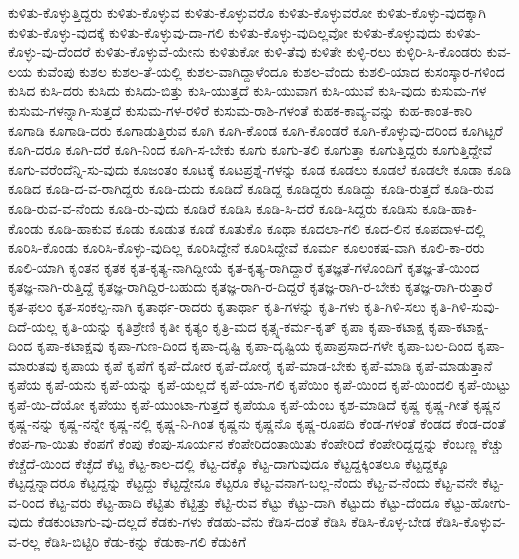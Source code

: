 {ಕುಳಿತು-ಕೊಳ್ಳುತ್ತಿದ್ದರು
ಕುಳಿತು-ಕೊಳ್ಳುವ
ಕುಳಿತು-ಕೊಳ್ಳುವರೊ
ಕುಳಿತು-ಕೊಳ್ಳುವರೋ
ಕುಳಿತು-ಕೊಳ್ಳು-ವುದಕ್ಕಾಗಿ
ಕುಳಿತು-ಕೊಳ್ಳು-ವುದಕ್ಕೆ
ಕುಳಿತು-ಕೊಳ್ಳುವು-ದಾ-ಗಲಿ
ಕುಳಿತು-ಕೊಳ್ಳು-ವುದಿಲ್ಲವೋ
ಕುಳಿತು-ಕೊಳ್ಳುವುದು
ಕುಳಿತು-ಕೊಳ್ಳು-ವು-ದೆಂದರೆ
ಕುಳಿತು-ಕೊಳ್ಳುವೆ-ಯೇನು
ಕುಳಿತುಕೋ
ಕುಳಿ-ತೆವು
ಕುಳಿತೇ
ಕುಳ್ಳಿ-ರಲು
ಕುಳ್ಳಿರಿ-ಸಿ-ಕೊಂಡರು
ಕುವ-ಲಯ
ಕುವೆಂಪು
ಕುಶಲ
ಕುಶಲ-ತೆ-ಯಲ್ಲಿ
ಕುಶಲ-ವಾಗಿದ್ದಾಳೆಂದೂ
ಕುಶಲ-ವೆಂದು
ಕುಶಲಿ-ಯಾದ
ಕುಸಂಸ್ಕಾರ-ಗಳಿಂದ
ಕುಸಿದ
ಕುಸಿ-ದರು
ಕುಸಿದು
ಕುಸಿದು-ಬಿತ್ತು
ಕುಸಿ-ಯುತ್ತದೆ
ಕುಸಿ-ಯುವಾಗ
ಕುಸಿ-ಯುವೆ
ಕುಸಿ-ವುದು
ಕುಸುಮ-ಗಳ
ಕುಸುಮ-ಗಳನ್ನಾಗಿ-ಸುತ್ತದೆ
ಕುಸುಮ-ಗಳ-ರಳಿರೆ
ಕುಸುಮ-ರಾಶಿ-ಗಳಂತೆ
ಕುಹಕ-ಕಾವ್ಯ-ವನ್ನು
ಕುಹ-ಕಾಂತ-ಕಾರಿ
ಕೂಗಾಡಿ
ಕೂಗಾಡಿ-ದರು
ಕೂಗಾಡುತ್ತಿರುವ
ಕೂಗಿ
ಕೂಗಿ-ಕೊಂಡ
ಕೂಗಿ-ಕೊಂಡರೆ
ಕೂಗಿ-ಕೊಳ್ಳುವು-ದರಿಂದ
ಕೂಗಿಟ್ಟರೆ
ಕೂಗಿ-ದರೂ
ಕೂಗಿ-ದರೆ
ಕೂಗಿ-ನಿಂದ
ಕೂಗಿ-ಸ-ಬೇಕು
ಕೂಗು
ಕೂಗು-ತಲಿ
ಕೂಗುತ್ತಾ
ಕೂಗುತ್ತಿದ್ದರು
ಕೂಗುತ್ತಿದ್ದೇವೆ
ಕೂಗು-ವರೆಂದೆನ್ನಿ-ಸು-ವುದು
ಕೂಜಂತಂ
ಕೂಟಕ್ಕೆ
ಕೂಟಪ್ರಶ್ನೆ-ಗಳನ್ನು
ಕೂಡ
ಕೂಡಲು
ಕೂಡಲೆ
ಕೂಡಲೇ
ಕೂಡಾ
ಕೂಡಿ
ಕೂಡಿದ
ಕೂಡಿ-ದ-ವ-ರಾಗಿದ್ದರು
ಕೂಡಿ-ದುದು
ಕೂಡಿದೆ
ಕೂಡಿದ್ದ
ಕೂಡಿದ್ದರು
ಕೂಡಿದ್ದು
ಕೂಡಿ-ರುತ್ತದೆ
ಕೂಡಿ-ರುವ
ಕೂಡಿ-ರುವ-ವ-ನೆಂದು
ಕೂಡಿ-ರು-ವುದು
ಕೂಡಿರೆ
ಕೂಡಿಸಿ
ಕೂಡಿ-ಸಿ-ದರೆ
ಕೂಡಿ-ಸಿದ್ದರು
ಕೂಡಿಸು
ಕೂಡಿ-ಹಾಕಿ-ಕೊಂಡು
ಕೂಡಿ-ಹಾಕುವ
ಕೂಡು
ಕೂಡುತ
ಕೂಡೆ
ಕೂತುಕೊ
ಕೂಥಾ
ಕೂದಲಾ-ಗಲಿ
ಕೂದ-ಲಿನ
ಕೂಪದಾಳ-ದಲ್ಲಿ
ಕೂರಿಸಿ-ಕೊಂಡು
ಕೂರಿಸಿ-ಕೊಳ್ಳು-ವುದಿಲ್ಲ
ಕೂರಿಸಿದ್ದೇನೆ
ಕೂರಿಸಿದ್ದೇವೆ
ಕೂರ್ಮ
ಕೂಲಂಕಷ-ವಾಗಿ
ಕೂಲಿ-ಕಾ-ರರು
ಕೂಲಿ-ಯಾಗಿ
ಕೃಂತನ
ಕೃತಕ
ಕೃತ-ಕೃತ್ಯ-ನಾಗಿದ್ದೀಯೆ
ಕೃತ-ಕೃತ್ಯ-ರಾಗಿದ್ದಾರೆ
ಕೃತಜ್ಞತೆ-ಗಳೊಂದಿಗೆ
ಕೃತಜ್ಞ-ತೆ-ಯಿಂದ
ಕೃತಜ್ಞ-ನಾಗಿ-ರುತ್ತಿದ್ದೆ
ಕೃತಜ್ಞ-ರಾಗಿದ್ದಿರ-ಬಹುದು
ಕೃತಜ್ಞ-ರಾಗಿ-ರ-ದಿದ್ದರೆ
ಕೃತಜ್ಞ-ರಾಗಿ-ರ-ಬೇಕು
ಕೃತಜ್ಞ-ರಾಗಿ-ರುತ್ತಾರೆ
ಕೃತ-ಫಲಂ
ಕೃತ-ಸಂಕಲ್ಪ-ನಾಗಿ
ಕೃತಾರ್ಥ-ರಾದರು
ಕೃತಾರ್ಥಾ
ಕೃತಿ-ಗಳನ್ನು
ಕೃತಿ-ಗಳು
ಕೃತಿ-ಗಿಳಿ-ಸಲು
ಕೃತಿ-ಗಿಳಿ-ಸುವು-ದಿದೆ-ಯಲ್ಲ
ಕೃತಿ-ಯನ್ನು
ಕೃತಿಶ್ರೇಣಿ
ಕೃತೀ
ಕೃತ್ಯಂ
ಕೃತ್ರಿ-ಮದ
ಕೃತ್ಸ್ನ-ಕರ್ಮ-ಕೃತ್
ಕೃಪಾ
ಕೃಪಾ-ಕಟಾಕ್ಷ
ಕೃಪಾ-ಕಟಾಕ್ಷ-ದಿಂದ
ಕೃಪಾ-ಕಟಾಕ್ಷವು
ಕೃಪಾ-ಗುಣ-ದಿಂದ
ಕೃಪಾ-ದೃಷ್ಟಿ
ಕೃಪಾ-ದೃಷ್ಟಿಯ
ಕೃಪಾಪ್ರಸಾದ-ಗಳೇ
ಕೃಪಾ-ಬಲ-ದಿಂದ
ಕೃಪಾ-ಮಾರುತವು
ಕೃಪಾಯ
ಕೃಪೆ
ಕೃಪೆಗೆ
ಕೃಪೆ-ದೋರ
ಕೃಪೆ-ದೋರೈ
ಕೃಪೆ-ಮಾಡ-ಬೇಕು
ಕೃಪೆ-ಮಾಡಿ
ಕೃಪೆ-ಮಾಡುತ್ತಾನೆ
ಕೃಪೆಯ
ಕೃಪೆ-ಯನು
ಕೃಪೆ-ಯನ್ನು
ಕೃಪೆ-ಯಲ್ಲದೆ
ಕೃಪೆ-ಯಾ-ಗಲಿ
ಕೃಪೆಯಿಂ
ಕೃಪೆ-ಯಿಂದ
ಕೃಪೆ-ಯಿಂದಲಿ
ಕೃಪೆ-ಯಿಟ್ಟು
ಕೃಪೆ-ಯಿ-ದೆಯೋ
ಕೃಪೆಯು
ಕೃಪೆ-ಯುಂಟಾ-ಗುತ್ತದೆ
ಕೃಪೆಯೂ
ಕೃಪೆ-ಯೆಂಬ
ಕೃಶ-ಮಾಡಿದೆ
ಕೃಷ್ಣ
ಕೃಷ್ಣ-ಗೀತೆ
ಕೃಷ್ಣನ
ಕೃಷ್ಣ-ನನ್ನು
ಕೃಷ್ಣ-ನನ್ನೇ
ಕೃಷ್ಣ-ನಲ್ಲಿ
ಕೃಷ್ಣ-ನಿ-ಗಿಂತ
ಕೃಷ್ಣನು
ಕೃಷ್ಣನೊ
ಕೃಷ್ಣ-ರೂಪದಿ
ಕೆಂಡ-ಗಳಂತೆ
ಕೆಂಡದ
ಕೆಂಡ-ದಂತೆ
ಕೆಂಪ-ಗಾ-ಯಿತು
ಕೆಂಪಗೆ
ಕೆಂಪು
ಕೆಂಪು-ಸೂರ್ಯನ
ಕೆಂಪೇರಿದಂತಾಯಿತು
ಕೆಂಪೇರಿದೆ
ಕೆಂಪೇರಿದ್ದದ್ದನ್ನು
ಕೆಂಬಣ್ಣ
ಕೆಚ್ಚು
ಕೆಚ್ಚೆದೆ-ಯಿಂದ
ಕೆಚ್ಛೆದೆ
ಕೆಟ್ಟ
ಕೆಟ್ಟ-ಕಾಲ-ದಲ್ಲಿ
ಕೆಟ್ಟ-ದಕ್ಕೊ
ಕೆಟ್ಟ-ದಾಗುವುದೂ
ಕೆಟ್ಟದ್ದಕ್ಕಿಂತಲೂ
ಕೆಟ್ಟದ್ದಕ್ಕೂ
ಕೆಟ್ಟದ್ದನ್ನಾದರೂ
ಕೆಟ್ಟದ್ದನ್ನು
ಕೆಟ್ಟದ್ದು
ಕೆಟ್ಟದ್ದೇನೂ
ಕೆಟ್ಟರೂ
ಕೆಟ್ಟ-ವನಾಗ-ಬಲ್ಲ-ನೆಂದು
ಕೆಟ್ಟ-ವ-ನೆಂದು
ಕೆಟ್ಟ-ವನೇ
ಕೆಟ್ಟ-ವ-ರಿಂದ
ಕೆಟ್ಟ-ವರು
ಕೆಟ್ಟ-ಹಾದಿ
ಕೆಟ್ಟಿತು
ಕೆಟ್ಟಿತ್ತು
ಕೆಟ್ಟಿ-ರುವ
ಕೆಟ್ಟು
ಕೆಟ್ಟು-ದಾಗಿ
ಕೆಟ್ಟುದು
ಕೆಟ್ಟು-ದೆಂದೂ
ಕೆಟ್ಟು-ಹೋಗು-ವುದು
ಕೆಡಕುಂಟಾಗು-ವು-ದಲ್ಲದೆ
ಕೆಡಕು-ಗಳು
ಕೆಡಹು-ವೆನು
ಕೆಡಿಸ-ದಂತೆ
ಕೆಡಿಸಿ
ಕೆಡಿಸಿ-ಕೊಳ್ಳ-ಬೇಡ
ಕೆಡಿಸಿ-ಕೊಳ್ಳುವ-ವ-ರಲ್ಲ
ಕೆಡಿಸಿ-ಬಿಟ್ಟಿರಿ
ಕೆಡು-ಕನ್ನು
ಕೆಡುಕಾ-ಗಲಿ
ಕೆಡುಕಿಗೆ
}
